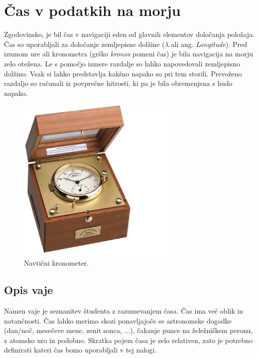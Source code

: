 %
\chapter{Čas v podatkih na morju}
\label{sec:v_cas} 

Zgodovinsko, je bil čas v navigaciji eden od glavnih elementov določanja položaja. Čas so uporabljali za določanje zemljepisne dolžine ($\lambda$ ali ang. \emph{Longitude}). Pred izumom ure ali  kronometra (grško \emph{kronos} pomeni čas) je bila navigacija na morju zelo otežena. Le s pomočjo izmere razdalje so lahko napovedovali zemljepisno dolžino. Vsak si lahko predstavlja kakšno napako so pri tem storili. Prevoženo razdaljo so računali iz povprečne hitrosti, ki pa je bila obremenjena s hudo napako.

\begin{figure}[!h]
	\centering \includegraphics[width=8cm]{Vaje/CasPomorstvo/figs/kronometer_01.png}
	\caption{Navtični kronometer.}
\end{figure}

\section{Opis vaje}
\label{sec:v_cas_opis}
Namen vaje je seznanitev študenta z razumevanjem časa. Čas ima več oblik in natančnosti. Čas lahko merimo skozi ponavljajoče se astronomske dogodke (dan/noč, mesečeve mene, zenit sonca, $\ldots$), čakanje punce na želežniškem peronu, z atomsko uro in podobno. Skratka pojem časa je zelo relativen, zato je potrebno definirati kateri čas bomo uporabljali v tej nalogi.

